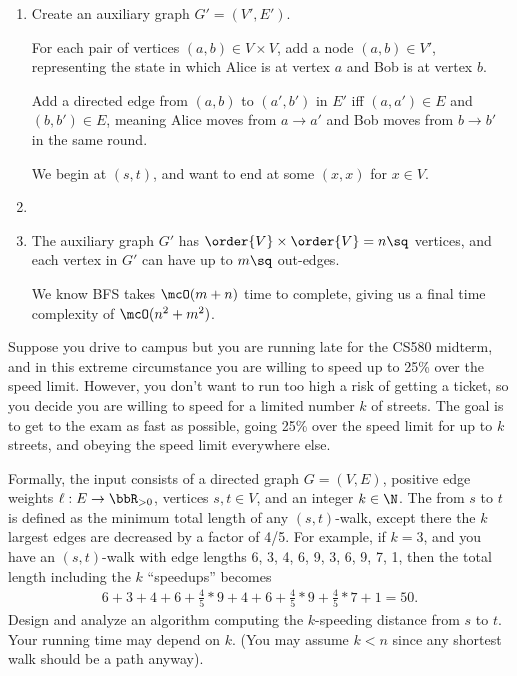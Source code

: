 \documentclass{article}
\begin{document}
\begin{solution}

\begin{enumerate}[label=(\alph*)]
  \item Create an auxiliary graph $G' = (V', E')$.

  For each pair of vertices $(a,b) \in V \times V$, add a node $(a,b) \in V'$, representing the state in which Alice is at vertex $a$ and Bob is at vertex $b$.

  Add a directed edge from $(a,b)$ to $(a',b')$ in $E'$ iff $(a, a') \in E$ and $(b, b') \in E$, meaning Alice moves from $a \to a'$ and Bob moves from $b \to b'$ in the same round.

  We begin at $(s,t)$, and want to end at some $(x, x)$ for $ x\in V $.

  \item {}

  \item The auxiliary graph $ G' $ has $ \order{V}\times\order{V}=n\sq $ vertices, and each vertex in $ G' $ can have up to $ m\sq $ out-edges.

  We know BFS takes $\mcO(m+n)$ time to complete, giving us a final time complexity of $\mcO(n^2 + m^2)$.
\end{enumerate}
\end{solution}
\pagebreak

\setcounter{exercise}{2}
\begin{exercise}
  Suppose you drive to campus but you are running late for the CS580 midterm, and in this extreme circumstance you are willing to speed up to 25\% over the speed limit.
  However, you don't want to run too high a risk of getting a ticket, so you decide you are willing to speed for a limited number $ k $ of streets.
  The goal is to get to the exam as fast as possible, going 25\% over the speed limit for up to $ k $ streets, and obeying the speed limit everywhere else.

  Formally, the input consists of a directed graph $G = (V, E)$, positive edge weights $ \ell:E\to \bbR_{>0} $, vertices $ s,t\in V $, and an integer $k \in \N$.
  The  from $s$ to $t$ is defined as the minimum total length of any $(s, t)$-walk, except there the $ k $ largest edges are decreased by a factor of 4/5.
  For example, if $k = 3$, and you have an $(s, t)$-walk with edge lengths 6, 3, 4, 6, 9, 3, 6, 9, 7, 1, then the total length including the $ k $ ``speedups'' becomes \begin{align*}
    6+3+4+6+\frac{4}{5}*9+4+6+\frac{4}{5}*9+\frac{4}{5}*7+1=50.
  \end{align*}
  Design and analyze an algorithm computing the $k$-speeding distance from $ s $ to $t$.
  Your running time may depend on $ k $. (You may assume $ k < n $ since any shortest walk should be a path anyway).
\end{exercise}
\end{document}
